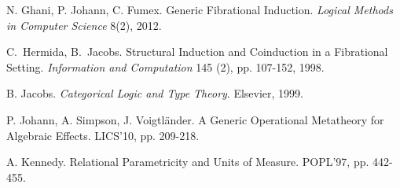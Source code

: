 \documentclass[a4paper,11pt]{article}
\begin{document}
{\begin{thebibliography}{}
\begin{multicols}{2}
N. Ghani, P. Johann, C. Fumex. Generic Fibrational Induction.
{\em Logical Methods in Computer Science} 8(2), 2012.


C.\ Hermida, B.\ Jacobs. Structural Induction and Coinduction in a
Fibrational Setting. {\em Information and Computation} 145 (2),
pp. 107-152, 1998. 




B. Jacobs. {\em Categorical Logic and Type Theory}. Elsevier, 1999.



P. Johann, A. Simpson, J. Voigtl\"ander. A Generic Operational
Metatheory for Algebraic Effects. LICS'10,
pp. 209-218. %



A. Kennedy. Relational Parametricity and Units of
Measure. POPL'97, %
pp. 442-455. %



\end{multicols}
\end{thebibliography}}
\end{document}
